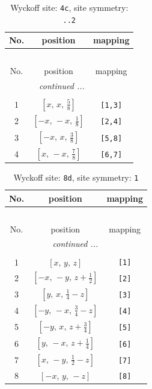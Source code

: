 \documentclass[fleqn,8pt]{jsarticle}
\begin{document}
\renewcommand{\arraystretch}{1.2}
\begin{longtable}{ccc}
\caption{Wyckoff site: {\tt 4c}, site symmetry: {\tt ..2}}
 \\
 \hline \hline
No. & position & mapping \\ \hline \endfirsthead

\multicolumn{2}{l}{\tablename\ \thetable{}} \\
 \hline \hline
No. & position & mapping \\ \hline \endhead

 \hline \hline
\multicolumn{2}{r}{\footnotesize\it continued ...} \\ \endfoot

 \hline \hline
\multicolumn{2}{r}{} \\ \endlastfoot

1 & $\left[ x,\, x,\, \frac{5}{8} \right]$ & {\tt [1,3]} \\ \hline
2 & $\left[ - x,\, - x,\, \frac{1}{8} \right]$ & {\tt [2,4]} \\ \hline
3 & $\left[ - x,\, x,\, \frac{3}{8} \right]$ & {\tt [5,8]} \\ \hline
4 & $\left[ x,\, - x,\, \frac{7}{8} \right]$ & {\tt [6,7]} \\
\end{longtable}
\renewcommand{\arraystretch}{1.2}
\begin{longtable}{ccc}
\caption{Wyckoff site: {\tt 8d}, site symmetry: {\tt 1}}
 \\
 \hline \hline
No. & position & mapping \\ \hline \endfirsthead

\multicolumn{2}{l}{\tablename\ \thetable{}} \\
 \hline \hline
No. & position & mapping \\ \hline \endhead

 \hline \hline
\multicolumn{2}{r}{\footnotesize\it continued ...} \\ \endfoot

 \hline \hline
\multicolumn{2}{r}{} \\ \endlastfoot

1 & $\left[ x,\, y,\, z \right]$ & {\tt [1]} \\ \hline
2 & $\left[ - x,\, - y,\, z + \frac{1}{2} \right]$ & {\tt [2]} \\ \hline
3 & $\left[ y,\, x,\, \frac{1}{4} - z \right]$ & {\tt [3]} \\ \hline
4 & $\left[ - y,\, - x,\, \frac{3}{4} - z \right]$ & {\tt [4]} \\ \hline
5 & $\left[ - y,\, x,\, z + \frac{3}{4} \right]$ & {\tt [5]} \\ \hline
6 & $\left[ y,\, - x,\, z + \frac{1}{4} \right]$ & {\tt [6]} \\ \hline
7 & $\left[ x,\, - y,\, \frac{1}{2} - z \right]$ & {\tt [7]} \\ \hline
8 & $\left[ - x,\, y,\, - z \right]$ & {\tt [8]} \\
\end{longtable}
\end{document}
